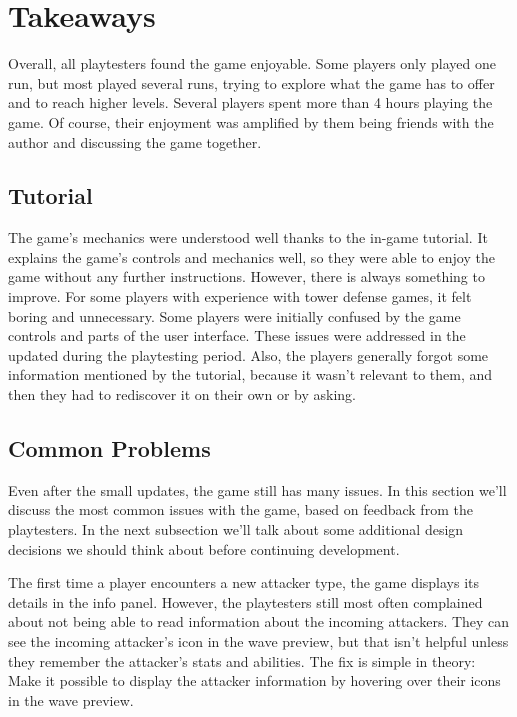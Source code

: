 \section{Takeaways}\label{sec:takeaways}

Overall, all playtesters found the game enjoyable.
Some players only played one run, but most played several runs, trying to explore what the game has to offer and to reach higher levels.
Several players spent more than 4 hours playing the game.
Of course, their enjoyment was amplified by them being friends with the author and discussing the game together.

\subsection{Tutorial}\label{sec:playtest-tutorial}
The game's mechanics were understood well thanks to the in-game tutorial.
It explains the game's controls and mechanics well, so they were able to enjoy the game without any further instructions.
However, there is always something to improve.
For some players with experience with tower defense games, it felt boring and unnecessary.
Some players were initially confused by the game controls and parts of the user interface.
These issues were addressed in the updated during the playtesting period.
Also, the players generally forgot some information mentioned by the tutorial, because it wasn't relevant to them, and then they had to rediscover it on their own or by asking.

\subsection{Common Problems}
Even after the small updates, the game still has many issues.
In this section we'll discuss the most common issues with the game, based on feedback from the playtesters.
In the next subsection we'll talk about some additional design decisions we should think about before continuing development.

The first time a player encounters a new attacker type, the game displays its details in the info panel.
However, the playtesters still most often complained about not being able to read information about the incoming attackers.
They can see the incoming attacker's icon in the wave preview, but that isn't helpful unless they remember the attacker's stats and abilities.
The fix is simple in theory:
Make it possible to display the attacker information by hovering over their icons in the wave preview.

